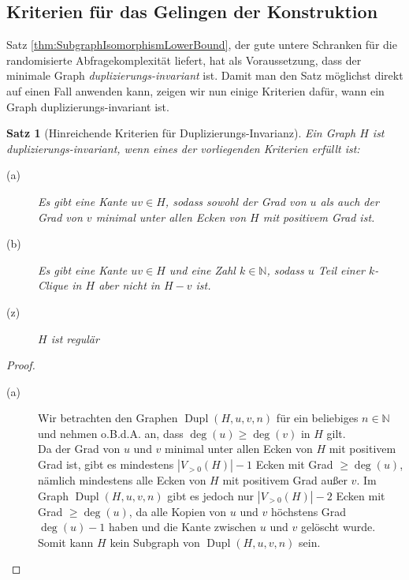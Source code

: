 \documentclass[a4paper]{scrreprt}
\newtheorem{Satz}[definition]{Satz}
\theoremstyle{definition}
\DeclareMathOperator\Dupl{Dupl}
\begin{document}
\subsection{Kriterien für das Gelingen der Konstruktion}
Satz \ref{thm:SubgraphIsomorphismLowerBound}, der gute
untere Schranken für die randomisierte Abfragekomplexität
liefert, hat als Voraussetzung, dass der minimale Graph
\emph{duplizierungs-invariant} ist. Damit man den 
Satz möglichst direkt auf einen Fall anwenden kann, 
zeigen wir nun einige Kriterien dafür, wann ein
Graph duplizierungs-invariant ist.
\begin{Satz}[Hinreichende Kriterien für Duplizierungs-Invarianz]
\label{thm:KriterienDuplizierungsInvariant}
Ein Graph $H$ ist duplizierungs-invariant, wenn eines
der vorliegenden Kriterien erfüllt ist:
\begin{description}
\item[(a)] Es gibt eine Kante $uv\in H$, sodass sowohl
           der Grad von $u$ als auch der Grad von $v$
           minimal unter allen Ecken von $H$ mit positivem
           Grad ist.
\item[(b)] Es gibt eine Kante $uv \in H$ und eine Zahl
           $k\in \mathbb{N}$, sodass $u$ Teil einer $k$-Clique
           in $H$ aber nicht in $H-v$ ist.
\item[(z)] $H$ ist regulär
\end{description}
\end{Satz}
\begin{proof}
\hfill
\begin{description}
\item[(a)] Wir betrachten den Graphen $\Dupl(H,u,v,n)$ für ein
           beliebiges $n\in \mathbb{N}$ und
           nehmen o.B.d.A. an, dass $\deg(u) \geq \deg(v)$ in $H$
           gilt. \\
           Da der Grad von $u$ und $v$ minimal unter allen
           Ecken von $H$ mit positivem Grad ist, gibt es
           mindestens $|V_{>0}(H)| - 1$ Ecken mit Grad $\geq \deg(u)$,
           nämlich mindestens alle Ecken von $H$ mit positivem Grad
           außer $v$.
           Im Graph $\Dupl(H,u,v,n)$ gibt es jedoch nur 
           $|V_{>0}(H)|-2$ Ecken mit Grad $\geq \deg(u)$, da alle
           Kopien von $u$ und $v$ höchstens Grad $\deg(u)-1$ haben
           und die Kante zwischen $u$ und $v$ gelöscht wurde.
           Somit kann $H$ kein Subgraph von $\Dupl(H,u,v,n)$ sein.
\end{description}
\end{proof}
\end{document}
